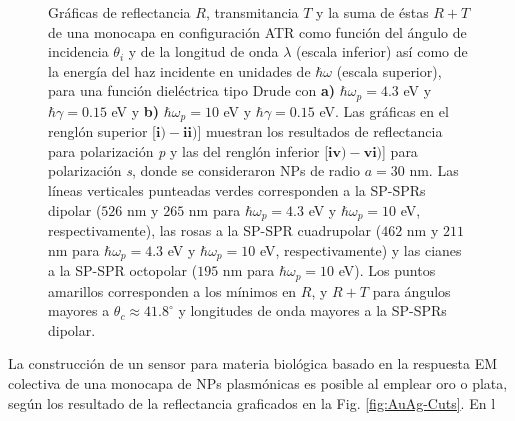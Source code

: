 \begin{figure}[h!]
\begin{subfigure}{.7\linewidth}
		\end{subfigure}\vspace*{-.5em}
	\caption{Gráficas de reflectancia $R$, transmitancia $T$ y la suma de éstas $R+T$ de una monocapa en configuración ATR como función del ángulo de incidencia $\theta_i$ y de la longitud de onda $\lambda$ (escala inferior) así como de la energía del haz incidente en unidades de $\hbar\omega$ (escala superior), para una función dieléctrica tipo Drude con \textbf{a)} $\hbar\omega_p=4. 3$ eV  y  $\hbar\gamma=0. 15$ eV y \textbf{b)} $\hbar\omega_p = 10$ eV y $\hbar\gamma = 0.15$ eV.  Las gráficas   en el renglón superior [$\mathbf{i)-ii)}$]  muestran los resultados de reflectancia para  polarización \emph{p} y las del renglón inferior  [$\mathbf{iv)-vi)}$] para polarización  \emph{s}, donde se consideraron NPs de radio $a=30$ nm. Las líneas verticales punteadas verdes corresponden a la SP-SPRs dipolar ($526$ nm y $265$ nm para $\hbar\omega_p=4.3$ eV y $\hbar\omega_p = 10$ eV, respectivamente), las rosas a la SP-SPR cuadrupolar ($462$ nm y $211$ nm para $\hbar\omega_p=4.3$ eV y $\hbar\omega_p = 10$ eV, respectivamente) y las cianes a la SP-SPR octopolar ($195$ nm para $\hbar\omega_p = 10$ eV). Los puntos amarillos corresponden a los mínimos en $R$, y $R+T$ para ángulos mayores a $\theta_c\approx 41.8^\circ$ y longitudes de onda mayores a la SP-SPRs dipolar. }\label{fig:RT-Omegas}
	\end{figure}	





La construcción de un sensor para materia biológica basado en la respuesta EM colectiva de una monocapa de NPs plasmónicas es posible al emplear oro o plata, según los resultado de la reflectancia graficados en la Fig. \ref{fig:AuAg-Cuts}.  En l




